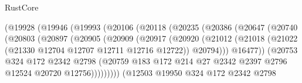 \begin{lexlean}{RustCore}
\begin{coremodule}
                        (@19928
                          (@19946
                            (@19993
                              (@20106
                                (@20118
                                  (@20235
                                    (@20386
                                      (@20647
                                        (@20740
                                          (@20803
                                            (@20897
                                              (@20905
                                                (@20909
                                                  (@20917
                                                    (@20920
                                                      (@21012
                                                        (@21018
                                                          (@21022
                                                            (@21330
                                                              @12704
                                                              @12707
                                                              @12711
                                                              @12716
                                                              @12722))
                                                          @20794)))
                                                    @16477))
                                                (@20753
                                                  @324
                                                  @172
                                                  @2342
                                                  @2798
                                                  (@20759
                                                    @183
                                                    @172
                                                    @214
                                                    @27
                                                    @2342
                                                    @2397
                                                    @2796
                                                    @12524
                                                    @20720
                                                    @12756)))))))))
                                  (@12503
                                    @19950
                                    @324
                                    @172
                                    @2342
                                    @2798

\end{coremodule}
\end{lexlean}
